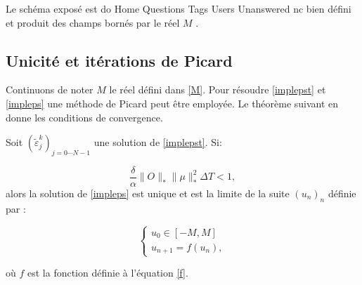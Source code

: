 Le schéma exposé est do
Home
Questions
Tags
Users
Unanswered
nc bien défini et produit des champs bornés par le réel $M$ .

\subsection{Unicité et itérations de Picard}
Continuons de noter $M$ le réel défini dans \eqref{M}. Pour résoudre \eqref{implepst} et \eqref{impleps} une méthode de Picard peut être employée. Le théorème suivant en donne les conditions de convergence.

\begin{theorem} \label{theopicard}
	Soit $(\tilde{\varepsilon}_j^k)_{j = 0\cdots N-1}$ une solution de \eqref{implepst}. Si:
	
	\begin{equation} \label{cond2.26}
	\frac{\delta}{\alpha} \lVert O\rVert_* \lVert \mu \rVert^2_* \Delta T < 1,
	\end{equation}
	alors la solution de \eqref{impleps} est unique et est la limite de la suite $(u_n )_n$ définie par :
	
	\begin{equation}
	\begin{cases}
	u_0 \in [-M,M]\\
	u_{n+1} = f(u_n),
	\end{cases}
	\end{equation}
	
	où $f$ est la fonction définie à l'équation \eqref{f}.
	
\end{theorem}

